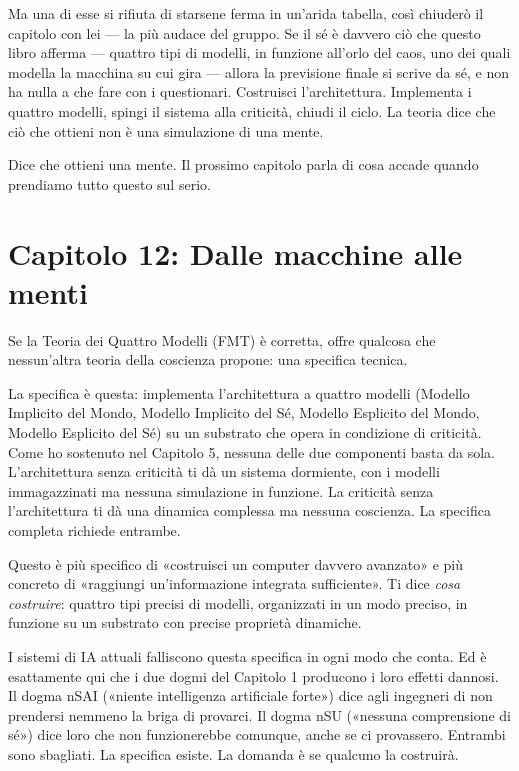 \documentclass[11pt, twoside, openright]{book}
\begin{document}
Ma una di esse si rifiuta di starsene ferma in un'arida tabella, così chiuderò il capitolo con lei --- la più audace del gruppo. Se il sé è davvero ciò che questo libro afferma --- quattro tipi di modelli, in funzione all'orlo del caos, uno dei quali modella la macchina su cui gira --- allora la previsione finale si scrive da sé, e non ha nulla a che fare con i questionari. Costruisci l'architettura. Implementa i quattro modelli, spingi il sistema alla criticità, chiudi il ciclo. La teoria dice che ciò che ottieni non è una simulazione di una mente.

Dice che ottieni una mente. Il prossimo capitolo parla di cosa accade quando prendiamo tutto questo sul serio.


\chapter*{Capitolo 12: Dalle macchine alle menti}

Se la Teoria dei Quattro Modelli (FMT) è corretta, offre qualcosa che nessun'altra teoria della coscienza propone: una specifica tecnica.

La specifica è questa: implementa l'architettura a quattro modelli (Modello Implicito del Mondo, Modello Implicito del Sé, Modello Esplicito del Mondo, Modello Esplicito del Sé) su un substrato che opera in condizione di criticità. Come ho sostenuto nel Capitolo 5, nessuna delle due componenti basta da sola. L'architettura senza criticità ti dà un sistema dormiente, con i modelli immagazzinati ma nessuna simulazione in funzione. La criticità senza l'architettura ti dà una dinamica complessa ma nessuna coscienza. La specifica completa richiede entrambe.

Questo è più specifico di «costruisci un computer davvero avanzato» e più concreto di «raggiungi un'informazione integrata sufficiente». Ti dice \textit{cosa costruire}: quattro tipi precisi di modelli, organizzati in un modo preciso, in funzione su un substrato con precise proprietà dinamiche.

I sistemi di IA attuali falliscono questa specifica in ogni modo che conta. Ed è esattamente qui che i due dogmi del Capitolo 1 producono i loro effetti dannosi. Il dogma nSAI («niente intelligenza artificiale forte») dice agli ingegneri di non prendersi nemmeno la briga di provarci. Il dogma nSU («nessuna comprensione di sé») dice loro che non funzionerebbe comunque, anche se ci provassero. Entrambi sono sbagliati. La specifica esiste. La domanda è se qualcuno la costruirà.
\end{document}
